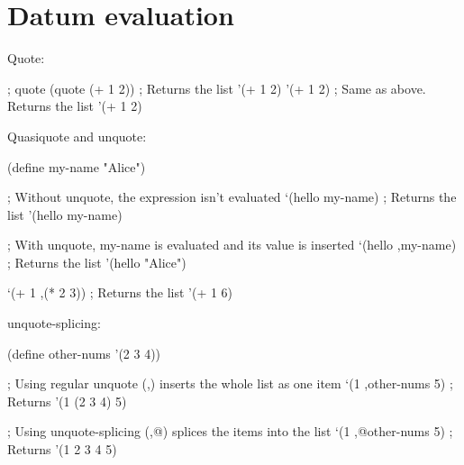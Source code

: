 \section{Datum evaluation}

Quote:

\begin{racketcode}
; quote
(quote (+ 1 2)) ; Returns the list '(+ 1 2)
'(+ 1 2)        ; Same as above. Returns the list '(+ 1 2)
\end{racketcode}

Quasiquote and unquote:

\begin{racketcode}
(define my-name "Alice")

; Without unquote, the expression isn't evaluated
`(hello my-name)          ; Returns the list '(hello my-name)

; With unquote, my-name is evaluated and its value is inserted
`(hello ,my-name)         ; Returns the list '(hello "Alice")

`(+ 1 ,(* 2 3))           ; Returns the list '(+ 1 6)
\end{racketcode}

unquote-splicing:

\begin{racketcode}
(define other-nums '(2 3 4))

; Using regular unquote (,) inserts the whole list as one item
`(1 ,other-nums 5)      ; Returns '(1 (2 3 4) 5)

; Using unquote-splicing (,@) splices the items into the list
`(1 ,@other-nums 5)     ; Returns '(1 2 3 4 5)
\end{racketcode}
